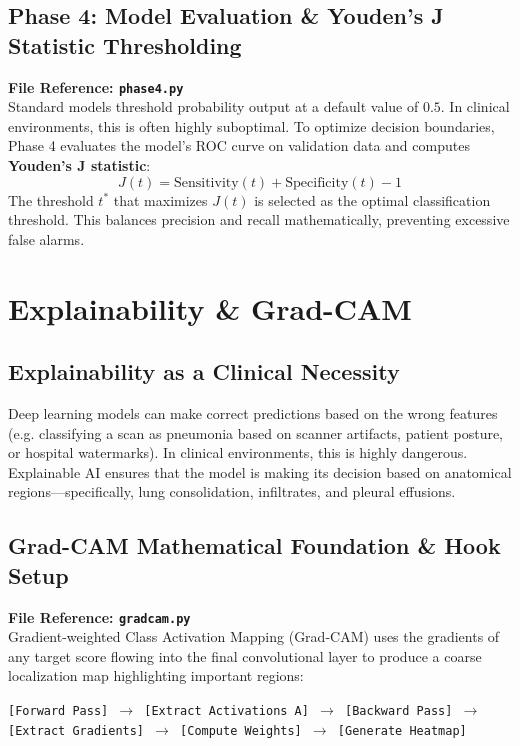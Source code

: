 \documentclass[12pt,oneside]{report}
\begin{document}
\section{Phase 4: Model Evaluation \& Youden's J Statistic Thresholding}
\textbf{File Reference: \texttt{phase4.py}} \\
Standard models threshold probability output at a default value of $0.5$. In clinical environments, this is often highly suboptimal. To optimize decision boundaries, Phase 4 evaluates the model's ROC curve on validation data and computes \textbf{Youden's J statistic}:
\begin{equation}
J(t) = \text{Sensitivity}(t) + \text{Specificity}(t) - 1
\end{equation}
The threshold $t^*$ that maximizes $J(t)$ is selected as the optimal classification threshold. This balances precision and recall mathematically, preventing excessive false alarms.

\chapter{Explainability \& Grad-CAM}

\section{Explainability as a Clinical Necessity}
Deep learning models can make correct predictions based on the wrong features (e.g. classifying a scan as pneumonia based on scanner artifacts, patient posture, or hospital watermarks). In clinical environments, this is highly dangerous. Explainable AI ensures that the model is making its decision based on anatomical regions—specifically, lung consolidation, infiltrates, and pleural effusions.

\section{Grad-CAM Mathematical Foundation \& Hook Setup}
\textbf{File Reference: \texttt{gradcam.py}} \\
Gradient-weighted Class Activation Mapping (Grad-CAM) uses the gradients of any target score flowing into the final convolutional layer to produce a coarse localization map highlighting important regions:
\begin{center}
    \texttt{[Forward Pass] $\to$ [Extract Activations A] $\to$ [Backward Pass] $\to$ [Extract Gradients] $\to$ [Compute Weights] $\to$ [Generate Heatmap]}
\end{center}
\end{document}
